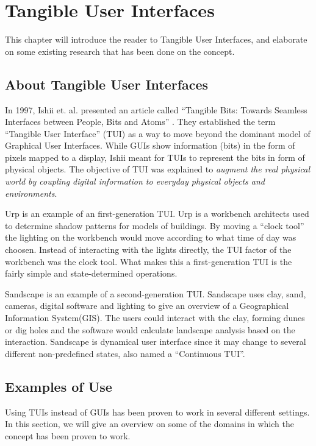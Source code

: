 \chapter{Tangible User Interfaces}
\label{chp:tangibleinterfaces}

This chapter will introduce the reader to Tangible User Interfaces, and elaborate on some existing research that has been done on the concept.   

\section{About Tangible User Interfaces}
\label{sec:abouttuis}

In 1997, Ishii et. al. presented an article called ``Tangible Bits: Towards Seamless Interfaces between People, Bits and Atoms'' \cite{ishii1997tangible}. They established the term ``Tangible User Interface'' (TUI) as a way to move beyond the dominant model of Graphical User Interfaces. 
While GUIs show information (bits) in the form of pixels mapped to a display, Ishii meant for TUIs to represent the bits in form of physical objects. The objective of TUI was explained to \emph{augment the real physical world by coupling digital information to everyday physical objects and environments}\cite{ishii1997tangible}. 

Urp\cite{underkoffler1999urp} is an example of an first-generation TUI. Urp is a workbench architects used to determine shadow patterns for models of buildings. By moving a ``clock tool'' the lighting on the workbench would move according to what time of day was choosen. Instead of interacting with the lights directly, the TUI factor of the workbench was the clock tool.
What makes this a first-generation TUI is the fairly simple and state-determined operations.

Sandscape\cite{ishii2004bringing} is an example of a second-generation TUI. Sandscape uses clay, sand, cameras, digital software and lighting to give an overview of a Geographical Information System(GIS). The users could interact with the clay, forming dunes or dig holes and the software would calculate landscape analysis based on the interaction. Sandscape is dynamical user interface since it may change to several different non-predefined states, also named a ``Continuous TUI''.


\section{Examples of Use}
\label{sec:tuiexamples}
Using TUIs instead of GUIs has been proven to work in several different settings. In this section, we will give an overview on some of the domains in which the concept has been proven to work. 

